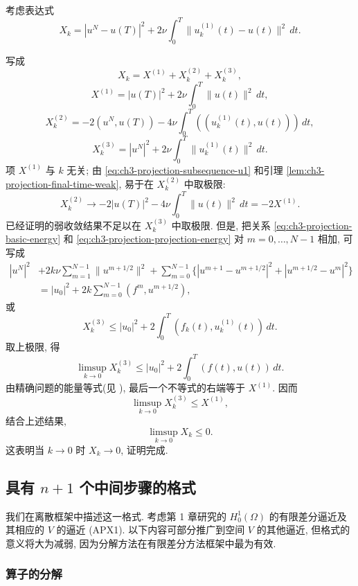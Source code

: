 \begin{Proof}
考虑表达式
\[
X_k=|u^N-u(T)|^2+2\nu\int_0^T\lVert u_k^{(1)}(t)-u(t)\rVert^2\,dt.
\]

\hypertarget{chapter-03-page-291}{}
写成
\[
X_k=X^{(1)}+X_k^{(2)}+X_k^{(3)},
\]
\[
X^{(1)}=|u(T)|^2+2\nu\int_0^T\lVert u(t)\rVert^2\,dt,
\]
\[
X_k^{(2)}=-2(u^N,u(T))-4\nu\int_0^T((u_k^{(1)}(t),u(t)))\,dt,
\]
\[
X_k^{(3)}=|u^N|^2+2\nu\int_0^T\lVert u_k^{(1)}(t)\rVert^2\,dt.
\]
项 $X^{(1)}$ 与 $k$ 无关; 由 \eqref{eq:ch3-projection-subsequence-u1} 和引理 \ref{lem:ch3-projection-final-time-weak}, 易于在 $X_k^{(2)}$ 中取极限:
\[
X_k^{(2)}\longrightarrow-2|u(T)|^2
-4\nu\int_0^T\lVert u(t)\rVert^2\,dt=-2X^{(1)}.
\]
已经证明的弱收敛结果不足以在 $X_k^{(3)}$ 中取极限. 但是, 把关系 \eqref{eq:ch3-projection-basic-energy} 和 \eqref{eq:ch3-projection-projection-energy} 对 $m=0,\ldots,N-1$ 相加, 可写成
\begin{align*}
|u^N|^2
&+2k\nu\sum_{m=1}^{N-1}\lVert u^{m+1/2}\rVert^2
+\sum_{m=0}^{N-1}\bigl\{|u^{m+1}-u^{m+1/2}|^2
+|u^{m+1/2}-u^m|^2\bigr\}\\
&=|u_0|^2+2k\sum_{m=0}^{N-1}(f^m,u^{m+1/2}),
\end{align*}
或
\[
X_k^{(3)}\leq|u_0|^2
+2\int_0^T(f_k(t),u_k^{(1)}(t))\,dt.
\]
取上极限, 得
\[
\limsup_{k\to0}X_k^{(3)}
\leq|u_0|^2+2\int_0^T(f(t),u(t))\,dt.
\]
由精确问题的能量等式(见 ), 最后一个不等式的右端等于 $X^{(1)}$. 因而
\[
\limsup_{k\to0}X_k^{(3)}\leq X^{(1)},
\]
结合上述结果,
\[
\limsup_{k\to0}X_k\leq0.
\]
这表明当 $k\to0$ 时 $X_k\to0$, 证明完成.
\end{Proof}

\hypertarget{chapter-03-page-292}{}
\subsection{具有 $n+1$ 个中间步骤的格式}
\label{subsec:ch3-projection-nplusone-step}

我们在离散框架中描述这一格式. 考虑第 1 章研究的 $H_0^1(\Omega)$ 的有限差分逼近及其相应的 $V$ 的逼近 (APX1). 以下内容可部分推广到空间 $V$ 的其他逼近, 但格式的意义将大为减弱, 因为分解方法在有限差分方法框架中最为有效.

\subsubsection{算子的分解}
\label{subsubsec:ch3-projection-operator-decomposition}


